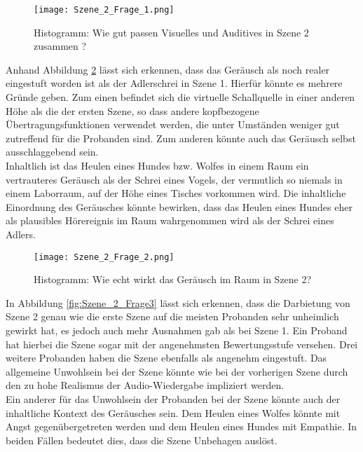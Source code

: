    \begin{figure}[H]
\centering
\texttt{[image: Szene\_2\_Frage\_1.png]}
\caption{Histogramm: Wie gut passen Visuelles und Auditives in Szene 2 zusammen ?}
\label{fig:Szene_2_Frage1}
\end{figure} 

Anhand Abbildung \ref{fig:Szene_2_Frage2} lässt sich erkennen, dass das Geräusch als noch realer eingestuft worden ist als der Adlerschrei in Szene 1. Hierfür könnte es mehrere Gründe geben. Zum einen befindet sich die virtuelle Schallquelle in einer anderen Höhe als die der ersten Szene, so dass andere kopfbezogene Übertragungsfunktionen verwendet werden, die unter Umständen weniger gut zutreffend für die Probanden sind. Zum anderen könnte auch das Geräusch selbst ausschlaggebend sein.\\

Inhaltlich ist das Heulen eines Hundes bzw. Wolfes in einem Raum ein vertrauteres Geräusch als der Schrei eines Vogels, der vermutlich so niemals in einem Laborraum, auf der Höhe eines Tisches vorkommen wird. Die inhaltliche Einordnung des Geräusches könnte bewirken, dass das Heulen eines Hundes eher als plausibles Hörereignis im Raum wahrgenommen wird als der Schrei eines Adlers.  

   \begin{figure}[H]
\centering
\texttt{[image: Szene\_2\_Frage\_2.png]}
\caption{Histogramm: Wie echt wirkt das Geräusch im Raum in Szene 2?}
\label{fig:Szene_2_Frage2}
\end{figure} 

In Abbildung \ref{fig:Szene_2_Frage3} lässt sich erkennen, dass die Darbietung von Szene 2 genau wie die erste Szene auf die meisten Probanden sehr unheimlich gewirkt hat, es jedoch auch mehr Ausnahmen gab als bei Szene 1. Ein Proband hat hierbei die Szene sogar mit der angenehmsten Bewertungsstufe versehen. Drei weitere Probanden haben die Szene ebenfalls als angenehm eingestuft. Das allgemeine Unwohlsein bei der Szene könnte wie bei der vorherigen Szene  durch den zu hohe Realismus der Audio-Wiedergabe impliziert werden. \\ 

Ein anderer für das Unwohlsein der Probanden bei der Szene könnte auch der inhaltliche Kontext des Geräusches sein. Dem Heulen eines Wolfes könnte mit Angst gegenübergetreten werden und dem Heulen eines Hundes mit Empathie. In beiden Fällen bedeutet dies, dass die Szene Unbehagen auslöst.  \\

